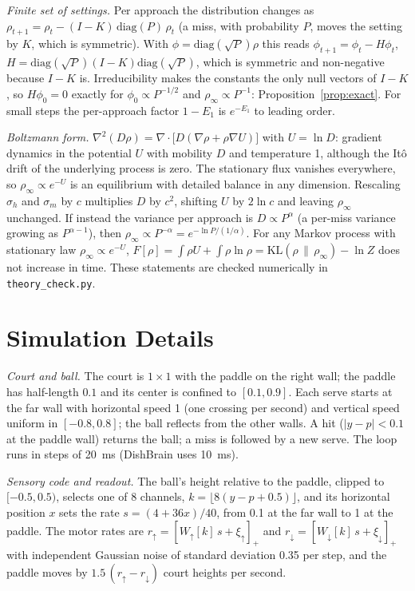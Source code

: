 \documentclass[12pt]{article}
\numberwithin{equation}{section}
\begin{document}
\emph{Finite set of settings.} Per approach the distribution changes as $\rho_{t+1}=\rho_t-(I-K)\,\mathrm{diag}(P)\,\rho_t$ (a miss, with probability $P$, moves the setting by $K$, which is symmetric). With $\phi=\mathrm{diag}(\sqrt P)\rho$ this reads $\phi_{t+1}=\phi_t-H\phi_t$, $H=\mathrm{diag}(\sqrt P)(I-K)\mathrm{diag}(\sqrt P)$, which is symmetric and non-negative because $I-K$ is. Irreducibility makes the constants the only null vectors of $I-K$, so $H\phi_0=0$ exactly for $\phi_0\propto P^{-1/2}$ and $\rho_\infty\propto P^{-1}$: Proposition~\ref{prop:exact}. For small steps the per-approach factor $1-E_1$ is $e^{-E_1}$ to leading order.

\emph{Boltzmann form.} $\nabla^2(D\rho)=\nabla\cdot\bigl[D(\nabla\rho+\rho\nabla U)\bigr]$ with $U=\ln D$: gradient dynamics in the potential $U$ with mobility $D$ and temperature 1, although the It\^o drift of the underlying process is zero. The stationary flux vanishes everywhere, so $\rho_\infty\propto e^{-U}$ is an equilibrium with detailed balance in any dimension. Rescaling $\sigma_h$ and $\sigma_m$ by $c$ multiplies $D$ by $c^2$, shifting $U$ by $2\ln c$ and leaving $\rho_\infty$ unchanged. If instead the variance per approach is $D\propto P^\alpha$ (a per-miss variance growing as $P^{\alpha-1}$), then $\rho_\infty\propto P^{-\alpha}=e^{-\ln P/(1/\alpha)}$. For any Markov process with stationary law $\rho_\infty\propto e^{-U}$, $F[\rho]=\int\rho U+\int\rho\ln\rho=\mathrm{KL}(\rho\,\|\,\rho_\infty)-\ln Z$ does not increase in time. These statements are checked numerically in \texttt{theory\_check.py}.

\section{Simulation Details}\label{app:sim}

\emph{Court and ball.} The court is $1\times1$ with the paddle on the right wall; the paddle has half-length $0.1$ and its center is confined to $[0.1,0.9]$. Each serve starts at the far wall with horizontal speed 1 (one crossing per second) and vertical speed uniform in $[-0.8,0.8]$; the ball reflects from the other walls. A hit ($|y-p|<0.1$ at the paddle wall) returns the ball; a miss is followed by a new serve. The loop runs in steps of 20~ms (DishBrain uses 10~ms).

\emph{Sensory code and readout.} The ball's height relative to the paddle, clipped to $[-0.5,0.5)$, selects one of 8 channels, $k=\lfloor8(y-p+0.5)\rfloor$, and its horizontal position $x$ sets the rate $s=(4+36x)/40$, from 0.1 at the far wall to 1 at the paddle. The motor rates are $r_\uparrow=[W_\uparrow[k]\,s+\xi_\uparrow]_+$ and $r_\downarrow=[W_\downarrow[k]\,s+\xi_\downarrow]_+$ with independent Gaussian noise of standard deviation 0.35 per step, and the paddle moves by $1.5\,(r_\uparrow-r_\downarrow)$ court heights per second.
\end{document}
